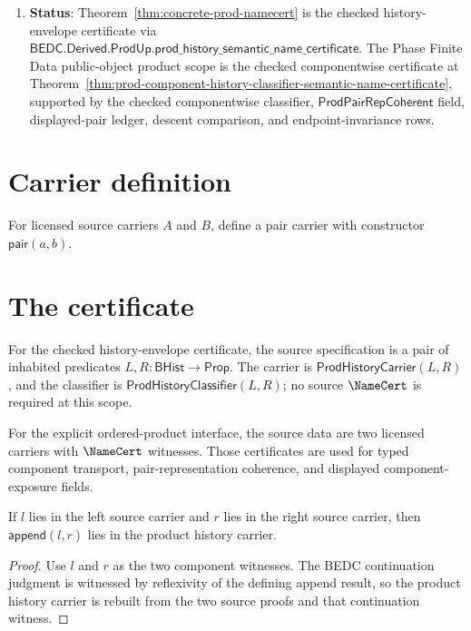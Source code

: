 \begin{enumerate}
  \item \textbf{Status}: Theorem~\ref{thm:concrete-prod-namecert} is the checked history-envelope certificate via $\mathsf{BEDC.Derived.ProdUp.prod\_history\_semantic\_name\_certificate}$. The Phase Finite Data public-object product scope is the checked componentwise certificate at Theorem~\ref{thm:prod-component-history-classifier-semantic-name-certificate}, supported by the checked componentwise classifier, $\mathsf{ProdPairRepCoherent}$ field, displayed-pair ledger, descent comparison, and endpoint-invariance rows.
\end{enumerate}

\section{Carrier definition}

\begin{definition}
\label{def:prod-carrier}
For licensed source carriers \(A\) and \(B\), define a pair carrier with constructor \(\mathsf{pair}(a,b)\).
\end{definition}

\section{The certificate}

\begin{definition}
\label{def:prod-source-specification}
For the checked history-envelope certificate, the source specification is a
pair of inhabited predicates $L,R:\mathsf{BHist}\to\mathsf{Prop}$. The carrier
is $\mathsf{ProdHistoryCarrier}(L,R)$, and the classifier is
$\mathsf{ProdHistoryClassifier}(L,R)$; no source $\NameCert$ is required at
this scope.

For the explicit ordered-product interface, the source data are two licensed
carriers with $\NameCert$ witnesses. Those certificates are used for typed
component transport, pair-representation coherence, and displayed component-exposure fields.
\end{definition}

\begin{theorem}
\label{thm:prod-history-carrier-append-intro}
If \(l\) lies in the left source carrier and \(r\) lies in the right source
carrier, then \(\mathsf{append}(l,r)\) lies in the product history carrier.
\end{theorem}
\begin{proof}
Use \(l\) and \(r\) as the two component witnesses. The BEDC continuation
judgment is witnessed by reflexivity of the defining append result, so the
product history carrier is rebuilt from the two source proofs and that
continuation witness.
\end{proof}

